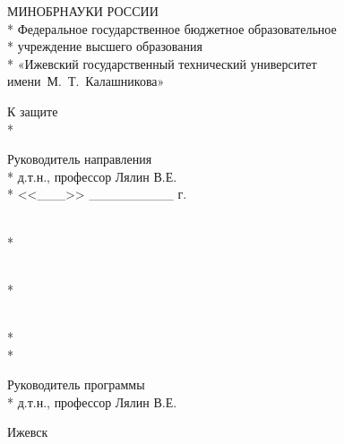 \begin{titlepage}

\thispagestyle{empty}

\begin{center}
\large
МИНОБРНАУКИ РОССИИ\\*
Федеральное государственное бюджетное образовательное\\*
учреждение высшего образования\\*
«Ижевский государственный технический университет имени~М.~Т.~Калашникова»
\vspace{1cm}
\end{center}

\hfill
\begin{minipage}{0.3\textwidth}
К защите\\*

Руководитель направления\\*
д.т.н., профессор Лялин В.Е.\\*
<<\_\_\_>> \_\_\_\_\_\_\_\_\_ \text{\myyear} г.
\end{minipage}

\vspace{6em}

\begin{center}
\textbf{\myfullname}\\*
\vspace{1em}
\titletext
\end{center}

\begin{center}
\myspeciality

\vspace{1em}

\textbf{\titletype}
\end{center}

\vspace{\fill}

\hfill
\begin{minipage}{0.3\textwidth}
\mylabel\\*
\myname

\vspace{1em}

\myteacherlabel\\*
\myteacherdegree\\*
\myteacher

\vspace{1em}

Руководитель программы\\*
д.т.н., профессор Лялин В.Е.

\vspace{1em}
\end{minipage}

\begin{center}
    Ижевск \myyear
\end{center}

\end{titlepage}

\setcounter{page}{2}
\pagestyle{plain}

